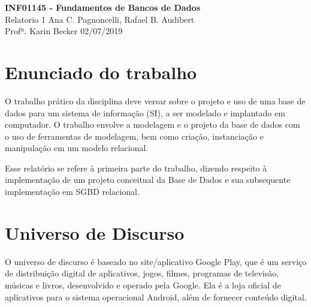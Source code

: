 \documentclass[a4paper, 11pt]{article}
\begin{document}
\noindent
\large\textbf{INF01145 - Fundamentos de Bancos de Dados} \hfill \\
\normalsize Relatorio 1 \hfill Ana C. Pagnoncelli, Rafael B. Audibert \\
Profª. Karin Becker \hfill 02/07/2019 \\

\section*{Enunciado do trabalho}

O trabalho prático da disciplina deve versar sobre o projeto e uso de uma base de dados para um sistema de informação (SI), a
ser modelado e implantado em computador. O trabalho envolve a modelagem e o projeto da base de dados com o uso de
ferramentas de modelagem, bem como criação, instanciação e manipulação em um modelo relacional.

Esse relatório se refere à primeira parte do trabalho, dizendo respeito à implementação de um projeto conceitual da Base de Dados e sua subsequente implementação em SGBD relacional.

\section*{Universo de Discurso}
O universo de discurso é baseado no site/aplicativo Google Play\cite{GooglePlay}, que é um serviço de distribuição digital de aplicativos, jogos, filmes, programas de televisão, músicas e livros, desenvolvido e operado pela Google\cite{Google}. Ela é a loja oficial de aplicativos para o sistema operacional Android, além de fornecer conteúdo digital.
\end{document}
